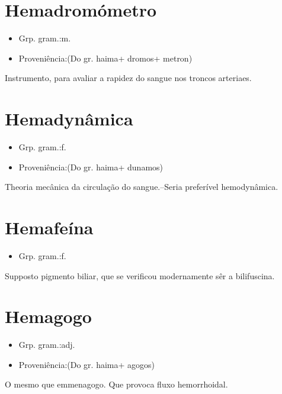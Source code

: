 \documentclass{article}
\begin{document}
\section{Hemadromómetro}
\begin{itemize}
\item {Grp. gram.:m.}
\end{itemize}
\begin{itemize}
\item {Proveniência:(Do gr. \textunderscore haima\textunderscore  + \textunderscore dromos\textunderscore  + \textunderscore metron\textunderscore )}
\end{itemize}
Instrumento, para avaliar a rapidez do sangue nos troncos arteriaes.
\section{Hemadynâmica}
\begin{itemize}
\item {Grp. gram.:f.}
\end{itemize}
\begin{itemize}
\item {Proveniência:(Do gr. \textunderscore haima\textunderscore  + \textunderscore dunamos\textunderscore )}
\end{itemize}
Theoria mecânica da circulação do sangue.--Seria preferível \textunderscore hemodynâmica\textunderscore .
\section{Hemafeína}
\begin{itemize}
\item {Grp. gram.:f.}
\end{itemize}
Supposto pigmento biliar, que se verificou modernamente sêr a \textunderscore bilifuscina\textunderscore .
\section{Hemagogo}
\begin{itemize}
\item {Grp. gram.:adj.}
\end{itemize}
\begin{itemize}
\item {Proveniência:(Do gr. \textunderscore haima\textunderscore  + \textunderscore agogos\textunderscore )}
\end{itemize}
O mesmo que \textunderscore emmenagogo\textunderscore .
Que provoca fluxo hemorrhoidal.
\end{document}
